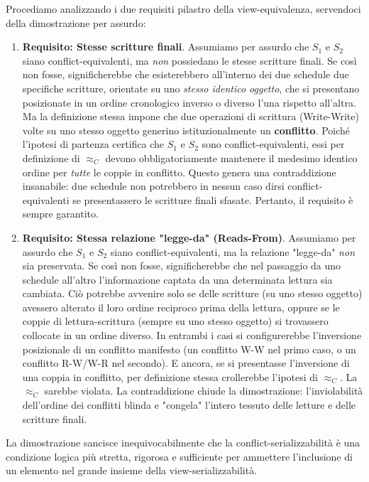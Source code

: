 Procediamo analizzando i due requisiti pilastro della view-equivalenza, servendoci della dimostrazione per assurdo:
\begin{enumerate}
    \item \textbf{Requisito: Stesse scritture finali}.
    Assumiamo per assurdo che $S_1$ e $S_2$ siano conflict-equivalenti, ma \textit{non} possiedano le stesse scritture finali. Se così non fosse, significherebbe che esisterebbero all'interno dei due schedule due specifiche scritture, orientate su uno \textit{stesso identico oggetto}, che si presentano posizionate in un ordine cronologico inverso o diverso l'una rispetto all'altra. Ma la definizione stessa impone che due operazioni di scrittura (Write-Write) volte su uno stesso oggetto generino istituzionalmente un \textbf{conflitto}. Poiché l'ipotesi di partenza certifica che $S_1$ e $S_2$ sono conflict-equivalenti, essi per definizione di $\approx_C$ devono obbligatoriamente mantenere il medesimo identico ordine per \textit{tutte} le coppie in conflitto. Questo genera una contraddizione insanabile: due schedule non potrebbero in nessun caso dirsi conflict-equivalenti se presentassero le scritture finali sfasate. Pertanto, il requisito è sempre garantito.
    \item \textbf{Requisito: Stessa relazione "legge-da" (Reads-From)}.
    Assumiamo per assurdo che $S_1$ e $S_2$ siano conflict-equivalenti, ma la relazione "legge-da" \textit{non} sia preservata. Se così non fosse, significherebbe che nel passaggio da uno schedule all'altro l'informazione captata da una determinata lettura sia cambiata. Ciò potrebbe avvenire solo se delle scritture (su uno stesso oggetto) avessero alterato il loro ordine reciproco prima della lettura, oppure se le coppie di lettura-scrittura (sempre su uno stesso oggetto) si trovassero collocate in un ordine diverso. In entrambi i casi si configurerebbe l'inversione posizionale di un conflitto manifesto (un conflitto W-W nel primo caso, o un conflitto R-W/W-R nel secondo). E ancora, se si presentasse l'inversione di una coppia in conflitto, per definizione stessa crollerebbe l'ipotesi di $\approx_C$. La $\approx_C$ sarebbe violata. La contraddizione chiude la dimostrazione: l'inviolabilità dell'ordine dei conflitti blinda e "congela" l'intero tessuto delle letture e delle scritture finali.
\end{enumerate}

La dimostrazione sancisce inequivocabilmente che la conflict-serializzabilità è una condizione logica più stretta, rigorosa e sufficiente per ammettere l'inclusione di un elemento nel grande insieme della view-serializzabilità.

